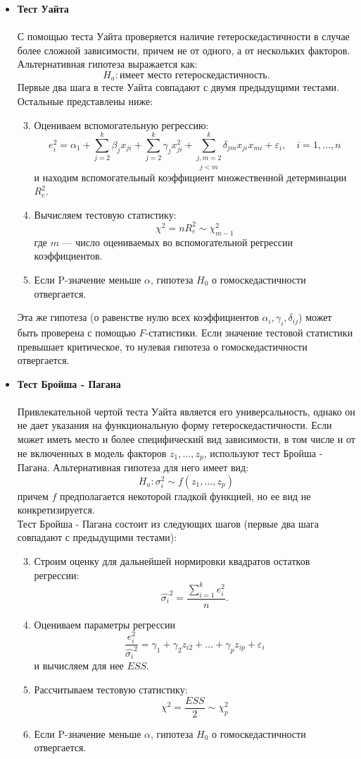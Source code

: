 \documentclass[a0,final]{a0poster}
\begin{document}
\begin{multicols}{4}
\begin{itemize}
\item \textbf{Тест Уайта}\\
\\
С помощью теста Уайта проверяется наличие гетероскедастичности в случае более сложной зависимости, причем не от одного, а от нескольких факторов. Альтернативная гипотеза выражается как: \[H_a: \text{имеет место гетероскедастичность}.\]
Первые два шага в тесте Уайта совпадают с двумя предыдущими тестами. Остальные представлены ниже:
\begin{enumerate}
\setcounter{enumi}{2}
\item Оцениваем вспомогательную регрессию: \[e_i^2 = \alpha_1 + \sum\limits_{j=2}^k {\beta_jx_{ji}} + \sum\limits_{j=2}^k {\gamma_{j}x_{ji}^2} + \underset{j < m}{\sum\limits_{j, m = 2}^k} {\delta_{jm}x_{ji}x_{mi}} + \varepsilon_i, \quad i=1, \ldots ,n\] и находим вспомогательный коэффициент множественной детерминации $R^2_e$.
\columnbreak

\item Вычисляем тестовую статистику:  \[\chi^2 = nR^2_e \sim \chi^2_{m-1}\]
где $m$ — число оцениваемых во вспомогательной регрессии коэффициентов.
\item Если P-значение меньше $\alpha$, гипотеза $H_0$ о гомоскедастичности отвергается.
\end{enumerate}
Эта же гипотеза (о равенстве нулю всех коэффициентов $\alpha_i, \gamma_i, \delta_{ij}$) может быть проверена с помощью $F$-статистики. Если значение тестовой статистики превышает критическое, то нулевая гипотеза о гомоскедастичности отвергается.\\

\item \textbf{Тест Бройша - Пагана}\\
\\
Привлекательной чертой теста Уайта является его универсальность,
однако он не дает указания на функциональную форму гетероскедастичности.
Если может иметь место и более специфический вид зависимости, в том числе и от не включенных в модель факторов $z_1, \ldots, z_p$, используют тест Бройша - Пагана. Альтернативная гипотеза для него имеет вид: \[H_a: \sigma_i^2 \sim f(z_1, \ldots,z_p)\] причем $f$ предполагается некоторой гладкой функцией, но ее вид не конкретизируется.\\
Тест Бройша - Пагана состоит из следующих шагов (первые два шага совпадают с предыдущими тестами):
\begin{enumerate}
\setcounter{enumi}{2}
\item Строим оценку для дальнейшей нормировки квадратов остатков регрессии: \[\hat{\sigma_i}^2 = \frac{\sum\limits_{i = 1}^k{e^2_i}}{n}.\]
\item Оцениваем параметры регрессии \[\frac{e_i^2}{\hat{\sigma_i}^2} = \gamma_1 + \gamma_2 z_{i2} + \ldots +\gamma_p z_{ip} + \varepsilon_i\] и вычисляем для нее $ESS$.
\item Рассчитываем тестовую статистику: \[\chi^2 = \frac{ESS}{2} \sim \chi^2_p\]
\item Если P-значение меньше $\alpha$, гипотеза $H_0$ о гомоскедастичности отвергается.
\end{enumerate}


\end{itemize}
\end{multicols}
\end{document}
